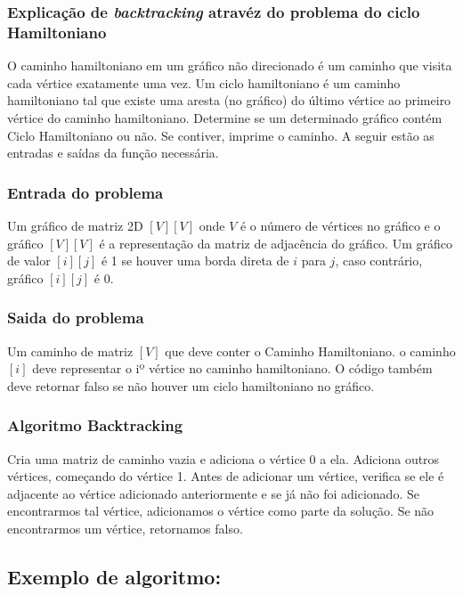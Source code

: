 \subsubsection*{Explicação de \emph{backtracking} atravéz do problema do ciclo Hamiltoniano}

O caminho hamiltoniano em um gráfico não direcionado é um caminho que visita cada vértice exatamente uma vez. 
Um ciclo hamiltoniano é um caminho hamiltoniano tal que existe uma aresta (no gráfico) do último vértice ao primeiro vértice do caminho hamiltoniano. 
Determine se um determinado gráfico contém Ciclo Hamiltoniano ou não. Se contiver, imprime o caminho. A seguir estão as entradas e saídas da função necessária.

\subsubsection*{Entrada do problema}

Um gráfico de matriz 2D $[V] [V]$ onde $V$ é o número de vértices no gráfico e o gráfico $[V] [V]$ é a representação da matriz de adjacência do gráfico. 
Um gráfico de valor $[i] [j]$ é 1 se houver uma borda direta de $i$ para $j$, caso contrário, gráfico $[i] [j]$ é 0.

\subsubsection*{Saida do problema}

Um caminho de matriz $[V]$ que deve conter o Caminho Hamiltoniano. o caminho $[i]$ deve representar o iº vértice no caminho hamiltoniano. 
O código também deve retornar falso se não houver um ciclo hamiltoniano no gráfico.

\subsubsection*{Algoritmo Backtracking}  

Cria uma matriz de caminho vazia e adiciona o vértice 0 a ela. 
Adiciona outros vértices, começando do vértice 1. 
Antes de adicionar um vértice, verifica se ele é adjacente ao vértice adicionado anteriormente e se já não foi adicionado. 
Se encontrarmos tal vértice, adicionamos o vértice como parte da solução. 
Se não encontrarmos um vértice, retornamos falso.

\subsection{Exemplo de algoritmo:}

